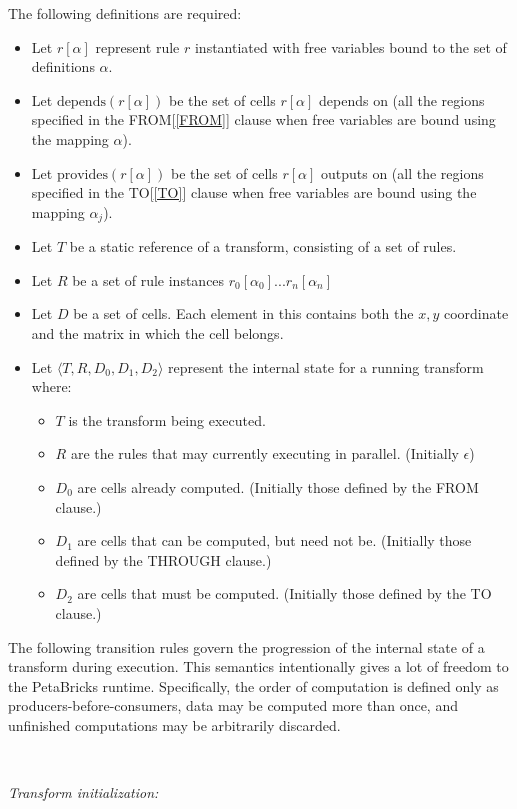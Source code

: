 \documentclass[11pt]{article}
\begin{document}
The following definitions are required:
\begin{itemize}
\item
Let $r[\alpha]$ represent rule $r$ instantiated with free variables
bound to the set of definitions $\alpha$.
\item
Let $\mbox{depends}(r[\alpha])$ be the set of cells $r[\alpha]$
depends on (all the regions specified in the FROM[\ref{FROM}] clause when
free variables are bound using the mapping $\alpha$).
\item
Let $\mbox{provides}(r[\alpha])$ be the set of cells $r[\alpha]$
outputs on (all the regions specified in the TO[\ref{TO}] clause when free
variables are bound using the mapping $\alpha_j$).
\item Let $T$ be a static reference of a transform, consisting of a set of rules.
\item Let $R$ be a set of rule instances $r_0[\alpha_0] ... r_n[\alpha_n]$
\item Let $D$ be a set of cells.  Each element in this contains both the $x,y$ coordinate and the matrix in which the cell belongs.
\item Let $\langle T, R, D_0, D_1, D_2 \rangle$ represent the internal state for a running transform where:
  \begin{itemize}
  \item $T$ is the transform being executed.
  \item $R$ are the rules that may currently executing in parallel.  (Initially $\epsilon$)
  \item $D_0$ are cells already computed.  (Initially those defined by the FROM clause.)
  \item $D_1$ are cells that can be computed, but need not be. (Initially those defined by the THROUGH clause.) 
  \item $D_2$ are cells that must be computed.  (Initially those defined by the TO clause.)
  \end{itemize}
\end{itemize}

The following transition rules govern the progression of the internal state
of a transform during execution.  This semantics intentionally gives a lot of
freedom to the PetaBricks runtime.  Specifically,  the order of computation
is defined only as producers-before-consumers, data may be computed more
than once, and unfinished computations may be arbitrarily discarded.

~

\noindent
{\it
Transform initialization:}
\end{document}
